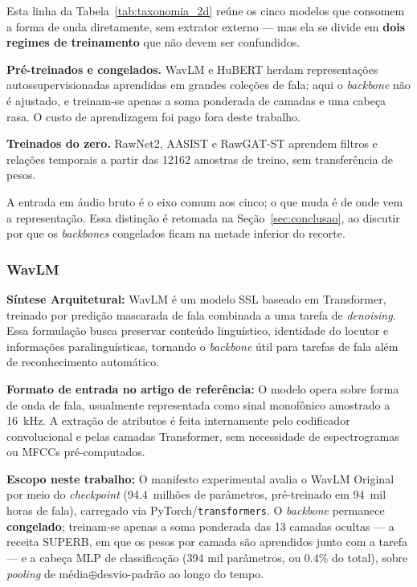 \documentclass[12pt,a4paper]{article}
\begin{document}
Esta linha da Tabela~\ref{tab:taxonomia_2d} reúne os cinco modelos que consomem
a forma de onda diretamente, sem extrator externo --- mas ela se divide em
\textbf{dois regimes de treinamento} que não devem ser confundidos.

\textbf{Pré-treinados e congelados.} WavLM e HuBERT herdam representações
autossupervisionadas aprendidas em grandes coleções de fala; aqui o
\textit{backbone} não é ajustado, e treinam-se apenas a soma ponderada de
camadas e uma cabeça rasa. O custo de aprendizagem foi pago fora deste
trabalho.

\textbf{Treinados do zero.} RawNet2, AASIST e RawGAT-ST aprendem filtros e
relações temporais a partir das \num{12162} amostras de treino, sem
transferência de pesos.

A entrada em áudio bruto é o eixo comum aos cinco; o que muda é de onde vem a
representação. Essa distinção é retomada na Seção~\ref{sec:conclusao}, ao
discutir por que os \textit{backbones} congelados ficam na metade inferior do
recorte.

\subsubsection[WavLM]{WavLM~\cite{chen2022wavlm}}
\textbf{Síntese Arquitetural:} WavLM é um modelo SSL baseado em Transformer,
treinado por predição mascarada de fala combinada a uma tarefa de \textit{denoising}.
Essa formulação busca preservar conteúdo linguístico, identidade do locutor e
informações paralinguísticas, tornando o \textit{backbone} útil para tarefas de
fala além de reconhecimento automático.

\par\textbf{Formato de entrada no artigo de referência:} O modelo opera sobre
forma de onda de fala, usualmente representada como sinal monofônico amostrado
a \SI{16}{\kilo\hertz}. A extração de atributos é feita internamente pelo
codificador convolucional e pelas camadas Transformer, sem necessidade de
espectrogramas ou MFCCs pré-computados.

\par\textbf{Escopo neste trabalho:} O manifesto experimental avalia o WavLM
Original por meio do \textit{checkpoint} 
(\num{94,4}~milhões de parâmetros, pré-treinado em \num{94}~mil horas de fala),
carregado via PyTorch/\texttt{transformers}. O \textit{backbone} permanece
\textbf{congelado}; treinam-se apenas a soma ponderada das \num{13} camadas
ocultas --- a receita SUPERB, em que os pesos por camada são aprendidos junto
com a tarefa --- e a cabeça MLP de classificação (\num{394} mil parâmetros, ou
\num{0,4}\% do total), sobre \textit{pooling} de média$\oplus$desvio-padrão ao
longo do tempo.
\end{document}
